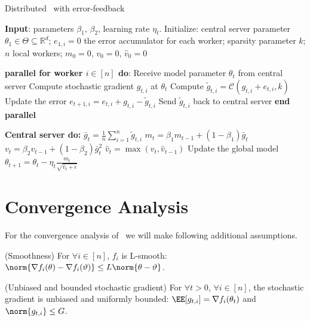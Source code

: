 \documentclass[11pt]{article}
\begin{document}
\begin{algorithm}[tb]
\caption{Distributed \algo\ with error-feedback} \label{alg:sparsams}
\begin{algorithmic}[1]

\STATE \textbf{Input}: parameters $\beta_1$, $\beta_2$, learning rate $\eta_t$. 
\STATE Initialize: central server parameter $\theta_{1} \in \Theta \subseteq \mathbb R^d$; $e_{1,i}=0$ the error accumulator for each worker; sparsity parameter $k$; $n$ local workers; $m_0=0$, $v_0=0$, $\hat v_0=0$


\STATE\textbf{parallel for worker $i \in [n]$ do}:
\STATE\quad  Receive model parameter $\theta_{t}$ from central server
\STATE\quad  Compute stochastic gradient $g_{t,i}$ at $\theta_t$
\STATE\quad  Compute $\tilde g_{t,i}=\mathcal C(g_{t,i}+e_{t,i},k)$ \label{line:topk} 
\STATE\quad  Update the error $e_{t+1,i}=e_{t,i}+g_{t,i}-\tilde g_{t,i}$
\STATE\quad  Send $\tilde g_{t,i}$ back to central server
\STATE \textbf{end parallel}

\STATE \textbf{Central server do:}
\STATE $\bar g_{t}=\frac{1}{n}\sum_{i=1}^n \tilde g_{t,i}$
\STATE $m_t=\beta_1 m_{t-1}+(1-\beta_1)\bar g_t$
\STATE $v_t=\beta_2 v_{t-1}+(1-\beta_2)\bar g_t^2$
\STATE $\hat v_t=\max(v_t,\hat v_{t-1})$ \label{line:v}
\STATE Update the global model $\theta_{t+1}=\theta_{t}-\eta_t\frac{m_t}{\sqrt{\hat v_t+\epsilon}}$

\ENDFOR
\end{algorithmic}
\end{algorithm}


\section{Convergence Analysis}\label{sec:theory}

For the convergence analysis of \algo\, we will make following additional assumptions.

\begin{assumption}\label{ass:smooth}(Smoothness)
For $\forall i \in [n]$, $f_i$ is  L-smooth: $\norm{\nabla f_i (\theta) - \nabla f_i (\vartheta)} \leq L \norm{\theta-\vartheta}$.
\end{assumption}

\begin{assumption}\label{ass:boundgrad}(Unbiased and bounded stochastic gradient)
For $\forall t >0$, $\forall i \in [n]$, the stochastic gradient is unbiased and uniformly bounded: $\EE[g_{t,i}] = \nabla f_i(\theta_t)$ and $\norm{g_{t,i}} \leq G$.
\end{assumption}
\end{document}
